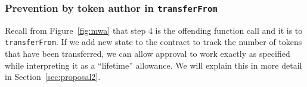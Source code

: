 

	
\subsubsection*{Prevention by token author in \texttt{transferFrom}} Recall from Figure~\ref{fig:mwa} that step 4 is the offending function call and it is to \texttt{transferFrom}. If we add new state to the contract to track the number of tokens that have been transferred, we can allow approval to work exactly as specified while interpreting it as a ``lifetime'' allowance. We will explain this in more detail in Section~\ref{sec:proposal2}. 



